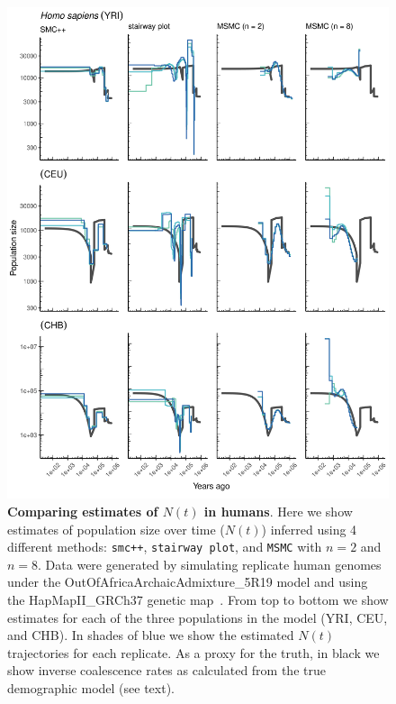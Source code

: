 \documentclass[12pt,halfline,a4paper]{ouparticle}
\newcommand{\MSMC}{\texttt{MSMC}\xspace}
\newcommand{\smcpp}{\texttt{smc++}\xspace}
\begin{document}
\begin{figure}
\begin{center}
\includegraphics[width=0.8\linewidth]{display_items/homo_sapiens_mask_Ragsdale.png}
\caption{\textbf{Comparing estimates of $N(t)$ in humans}. Here we show estimates of population
size over time ($N(t)$) inferred using 4 different methods: \smcpp, \texttt{stairway plot}, and
\MSMC with $n=2$ and $n=8$. Data were generated by simulating
replicate human genomes under the OutOfAfricaArchaicAdmixture\_5R19 model and using the
HapMapII\_GRCh37 genetic map~\citep{international2007second}. From top to bottom we show estimates for each
of the three populations in the model (YRI, CEU, and CHB). In shades of blue we show the estimated
$N(t)$ trajectories for each replicate.
As a proxy for the truth, in black we show inverse coalescence rates
as calculated from the true demographic model (see text).
}
\label{fig:n_t_ragsdale}
\end{center}
\end{figure}
\end{document}
